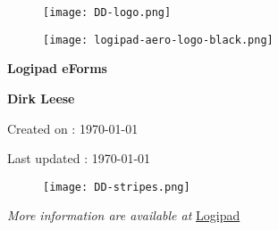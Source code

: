 
        \begin{titlepage}
            \centering
            \vspace*{0mm} %
            \begin{figure}[!h]
                \vspace*{-20mm}
                \texttt{[image: DD-logo.png]}
            \end{figure}
            \vspace{30mm} %
            \begin{figure}[!h]
                \centering
                \texttt{[image: logipad-aero-logo-black.png]}
            \end{figure}

            \vspace{10mm} 
            \textbf{\Huge {Logipad eForms}}

            \vspace{30mm}
            \Large \textbf{{Dirk Leese}}

            \small Created on : \today

            \vspace*{0mm}
            \small  Last updated : \MonthYearFormat\today
            
            \vspace{50mm}
            \begin{figure}[!h]
                \hspace*{-20mm}
                \texttt{[image: DD-stripes.png]}
            \end{figure}
            \vfill
            \small \textit{More information are available at }{\href{http://www.logipad.aero}{Logipad}}
        \end{titlepage}

        \tableofcontents
        \clearpage
